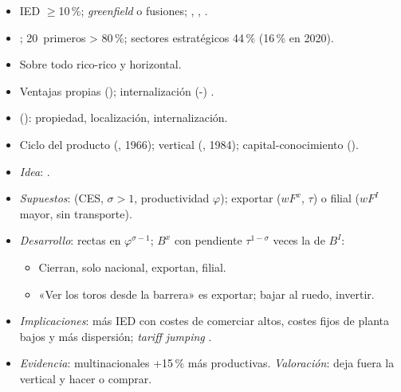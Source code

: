 \documentclass{article}
\begin{document}
\begin{columnas}
\begin{itemize}
\item IED $\geq$10\,\%; \emph{greenfield} o fusiones; , , .
\item {}; 20~primeros > 80\,\%; sectores estratégicos 44\,\% (16\,\% en 2020).
\item Sobre todo rico-rico y horizontal.
\end{itemize}
\begin{itemize}
\item Ventajas propias (); internalización (-) .
\item {} (): propiedad, localización, internalización.
\item Ciclo del producto (, 1966); vertical (, 1984); capital-conocimiento ().
\end{itemize}
\begin{itemize}
\item \emph{Idea}: .
\item \emph{Supuestos}:  (CES, $\sigma>1$, productividad $\varphi$); exportar ($wF^x$, $\tau$) o filial ($wF^I$ mayor, sin transporte).
\item \emph{Desarrollo}: rectas en $\varphi^{\sigma-1}$; $B^x$ con pendiente $\tau^{1-\sigma}$ veces la de $B^I$:
  \begin{itemize}
  \item Cierran, solo nacional, exportan, filial.
  \item «Ver los toros desde la barrera» es exportar; bajar al ruedo, invertir.
  \end{itemize}
\end{itemize}
\begin{itemize}
\item \emph{Implicaciones}: más IED con costes de comerciar altos, costes fijos de planta bajos y más dispersión; \emph{tariff jumping} .
\item \emph{Evidencia}: multinacionales +15\,\% más productivas. \emph{Valoración}: deja fuera la vertical y hacer o comprar.

\end{itemize}
\end{columnas}
\end{document}
